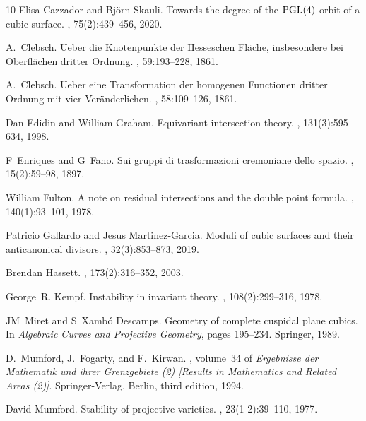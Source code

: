 \documentclass[reqno]{amsart}
\numberwithin{equation}{section}
\begin{document}
\begin{thebibliography}{10}
Elisa Cazzador and Bj\"orn Skauli.
\newblock Towards the degree of the {${\rm PGL}(4)$}-orbit of a cubic surface.
, 75(2):439--456, 2020.

A.~Clebsch.
\newblock Ueber die {K}notenpunkte der {H}esseschen {F}l\"{a}che, insbesondere bei {O}berfl\"{a}chen dritter {O}rdnung.
, 59:193--228, 1861.

A.~Clebsch.
\newblock Ueber eine {T}ransformation der homogenen {F}unctionen dritter {O}rdnung mit vier {V}er\"{a}nderlichen.
, 58:109--126, 1861.

Dan Edidin and William Graham.
\newblock Equivariant intersection theory.
, 131(3):595--634, 1998.

F~Enriques and G~Fano.
\newblock Sui gruppi di trasformazioni cremoniane dello spazio.
, 15(2):59--98, 1897.

William Fulton.
\newblock A note on residual intersections and the double point formula.
, 140(1):93--101, 1978.

Patricio Gallardo and Jesus Martinez-Garcia.
\newblock Moduli of cubic surfaces and their anticanonical divisors.
, 32(3):853--873, 2019.

Brendan {Hassett}.
, 173(2):316--352, 2003.

George~R. Kempf.
\newblock Instability in invariant theory.
, 108(2):299--316, 1978.

JM~Miret and S~Xamb{\'o} Descamps.
\newblock Geometry of complete cuspidal plane cubics.
\newblock In {\em Algebraic Curves and Projective Geometry}, pages 195--234. Springer, 1989.

D.~Mumford, J.~Fogarty, and F.~Kirwan.
, volume~34 of {\em Ergebnisse der Mathematik und ihrer Grenzgebiete (2) [Results in Mathematics and Related Areas (2)]}.
\newblock Springer-Verlag, Berlin, third edition, 1994.

David Mumford.
\newblock Stability of projective varieties.
, 23(1-2):39--110, 1977.


\end{thebibliography}
\end{document}
